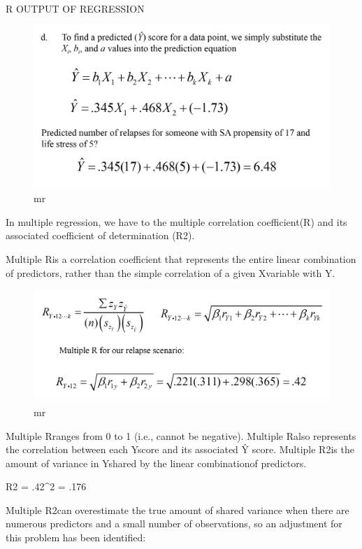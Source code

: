 \documentclass[]{book}
\theoremstyle{definition}
\theoremstyle{definition}
\theoremstyle{definition}
\theoremstyle{remark}
\begin{document}
R OUTPUT OF REGRESSION

\begin{figure}
\centering
\includegraphics{img/hicksmr8.png}
\caption{mr}
\end{figure}

In multiple regression, we have to the multiple correlation
coefficient(R) and its associated coefficient of determination (R2).

Multiple Ris a correlation coefficient that represents the entire linear
combination of predictors, rather than the simple correlation of a given
Xvariable with Y.

\begin{figure}
\centering
\includegraphics{img/hicksmr9.png}
\caption{mr}
\end{figure}

Multiple Rranges from 0 to 1 (i.e., cannot be negative). Multiple Ralso
represents the correlation between each Yscore and its associated Ŷ
score. Multiple R2is the amount of variance in Yshared by the linear
combinationof predictors.

R2 = .42\^{}2 = .176

Multiple R2can overestimate the true amount of shared variance when
there are numerous predictors and a small number of observations, so an
adjustment for this problem has been identified:
\end{document}
